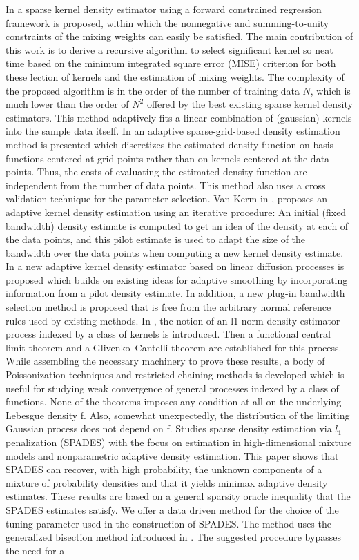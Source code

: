 In \cite{hong2013sparse} a sparse kernel density estimator using a forward constrained regression framework is proposed, within which the nonnegative and summing-to-unity constraints of the mixing weights can easily be satisfied. The main contribution of this work is to derive a recursive algorithm to select significant kernel so neat time based on the minimum integrated square error (MISE) criterion for both these lection of kernels and the estimation of mixing weights. The complexity of the proposed algorithm is in the order of the number of training data $N$, which is much lower than the order of $N^2$ offered by the best existing sparse kernel density estimators. This method adaptively fits a linear combination of (gaussian) kernels into the sample data itself. In \cite{peherstorfer2014density} an adaptive sparse-grid-based density estimation method is presented which discretizes the estimated density function on basis functions centered at grid points rather than on kernels centered at the data points. Thus, the costs of evaluating the estimated density function are independent from the number of data points. This method also uses a cross validation technique for the parameter selection. Van Kerm in \cite{van2003adaptive}, proposes an adaptive kernel density estimation using an iterative procedure: An initial (fixed bandwidth) density estimate is computed to get an idea of the density at each of the data points, and this pilot estimate is used to adapt the size of the bandwidth over the data points when computing a new kernel density estimate. In \cite{botev2010kernel} a new adaptive kernel density estimator based on linear diffusion processes is proposed which builds on existing ideas for adaptive smoothing by incorporating information from a pilot density estimate. In addition, a new plug-in bandwidth selection method is proposed that is free from the arbitrary normal reference rules used by existing methods. In \cite{gine2003l1}, the notion of an l1-norm density estimator process indexed by a class of kernels is introduced. Then a functional central limit theorem and a Glivenko–Cantelli theorem are established for this process. While assembling the necessary machinery to prove these results, a body of Poissonization techniques and restricted chaining methods is developed which is useful for studying weak convergence of general processes indexed by a class of functions. None of the theorems imposes any condition at all on the underlying Lebesgue density f. Also, somewhat unexpectedly, the distribution of the limiting Gaussian process does not depend on f. \cite{bunea2010spades} Studies sparse density estimation via $l_1$ penalization (SPADES) with the focus on estimation in high-dimensional mixture models and nonparametric adaptive density estimation. This paper shows that SPADES can recover, with high probability, the unknown components of a mixture of probability densities and that it yields minimax adaptive density estimates. These results are based on a general sparsity oracle inequality that the SPADES estimates satisfy. We offer a data driven method for the choice of the tuning parameter used in the construction of SPADES. The method uses the generalized bisection method introduced in \cite{bunea2009dimension}. The suggested procedure bypasses the need for a 